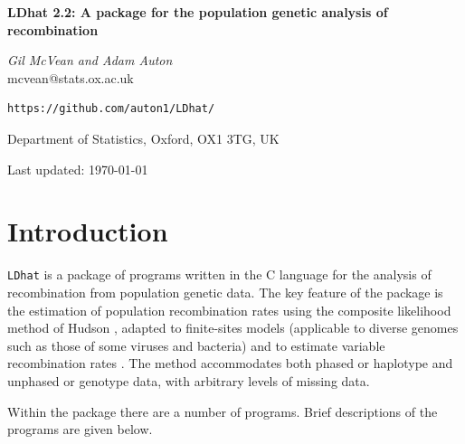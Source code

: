 \documentclass[a4paper,10pt,fullpage]{article}
\begin{document}
\begin{titlepage}

\flushleft

{\Large \bf LDhat 2.2: A package for the population genetic analysis
of recombination\\}

\vspace{1.5cm} {\it Gil McVean and Adam Auton\\}
mcvean@stats.ox.ac.uk\\
\begin{verbatim}
https://github.com/auton1/LDhat/
\end{verbatim}

\vspace{0.75cm}
Department of Statistics, Oxford, OX1 3TG, UK\\
\vspace{5.0cm}

Last updated: \today

\end{titlepage}

\tableofcontents

\newpage

\section{Introduction}
\verb+LDhat+ is a package of programs written in the C language for the
analysis of recombination from population genetic data.  The key
feature of the package is the estimation of population
recombination rates using the composite likelihood method of
Hudson \cite{Hudson01}, adapted to finite-sites models (applicable
to diverse genomes such as those of some viruses and bacteria)
\cite{McVeanetal02} and to estimate variable recombination rates
\cite{McVeanetal04, AutonMcVean07}. The method accommodates both phased or
haplotype and unphased or genotype data, with arbitrary levels of
missing data.

Within the package there are a number of programs.  Brief
descriptions of the programs are given below.
\end{document}
